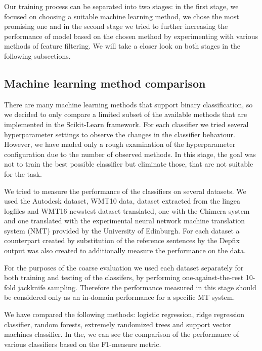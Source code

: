 Our training process can be separated into two stages: in the first stage, we
focused on choosing a suitable machine learning method, we chose the most promising
one and in the second stage we tried to further increasing the performance of model
based on the chosen method by experimenting with various methods of feature filtering.
We will take a closer look on both stages in the following subsections.

\subsection{Machine learning method comparison}

There are many machine learning methods that support binary classification, so we
decided to only compare a limited subset of the available methods that are implemented
in the Scikit-Learn framework. For each classifier we tried several hyperparameter
settings to observe the changes in the classifier behaviour. However, we have maded only
a rough examination of the hyperparameter configuration due to the number of observed
methods. In this stage, the goal was not to train the best possible classifier but
eliminate those, that are not suitable for the task.

We tried to measure the performance of the classifiers on several datasets. We used
the Autodesk dataset, WMT10 data, dataset extracted from the lingea logfiles and
WMT16 newstest dataset translated, one with the Chimera system and
one translated with the experimental neural network machine translation system (NMT)
provided by the University of Edinburgh. For each dataset a counterpart
created by substitution of the reference sentences by the Depfix output was also created
to additionally measure the performance on the  data.

For the purposes of the coarse evaluation we used each dataset separately for both training
and testing of the classifers, by performing one-against-the-rest 10-fold jackknife sampling.
Therefore the performance measured in this stage should be considered only as an in-domain
performance for a specific MT system.

We have compared the following methods: logistic regression, ridge regression classifier,
random forests, extremely randomized trees and support vector machines classifier.
In the, we can see the comparison of the performance of various classifiers based
on the F1-measure metric. %

